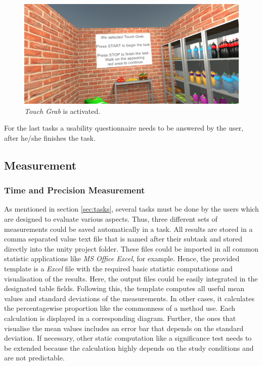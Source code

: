 \begin{figure}[H] 
	\center 
	\includegraphics[width=12cm]{Images/TaskWall_2.PNG}
	\caption[\textit{Touch Grab} is activated.]{\textit{Touch Grab} is activated.}
	\label{fig:taskW2}
\end{figure}

For the last tasks a usability questionnaire needs to be answered by the user, after he/she finishes the task. 


\subsection{Measurement} \label{sec:measurement}

\subsubsection{Time and Precision Measurement}
As mentioned in section \ref{sec:tasks}, several tasks must be done by the users which are designed to evaluate various aspects. Thus, three different sets of measurements could be saved automatically in a task. All results are stored in a comma separated value text file that is named after their subtask and stored directly into the unity project folder. These files could be imported in all common statistic applications like \textit{MS Office Excel}, for example. Hence, the provided template is a \textit{Excel} file with the required basic statistic computations and visualisation of the results. Here, the output files could be easily integrated in the designated table fields. Following this, the template computes all useful mean values and standard deviations of the measurements. In other cases, it calculates the percentagewise proportion like the commonness of a method use. Each calculation is displayed in a corresponding diagram. Further, the ones that visualise the mean values includes an error bar that depends on the standard deviation. If necessary, other static computation like a significance test needs to be extended because the calculation highly depends on the study conditions and are not predictable.

